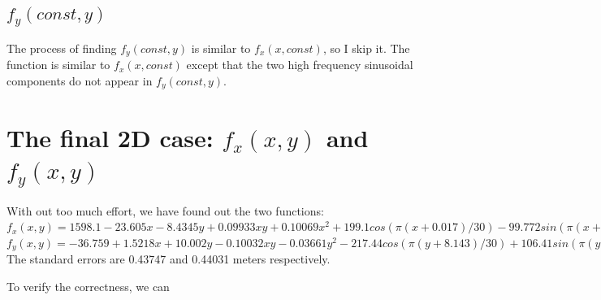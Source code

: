 \documentclass[a4paper]{article}
\begin{document}
\subsection{$f_y(const, y)$}

The process of finding $f_y(const, y)$ is similar to $f_x(x, const)$, so I skip
it. The function is similar to $f_x(x, const)$ except that the two high
frequency sinusoidal components do not appear in $f_y(const, y)$.

\section{The final 2D case: $f_x(x,y)$ and $f_y(x,y)$}
With out too much effort, we have found out the two functions:
$f_x(x,y) = 1598.1-23.605x -8.4345y +0.09933xy +0.10069x^2
+199.1cos(\pi(x+0.017)/30) -99.772sin(\pi(x+0.0039)/12+\pi/4)
-26.687sin(\pi(x-0.0039)/3) -13.345sin(\pi(x-0.0039))
+13.338sin(2\pi(x-0.0039)) +13.331sin(6\pi(x-0.0039))$ $f_y(x,y) = -36.759
+1.5218x +10.002y -0.10032xy -0.03661y^2 -217.44cos(\pi(y+8.143)/30)
+106.41sin(\pi(y+1.1)/12) -26.697sin(\pi(y+1)/3) +13.335sin(\pi y)
-13.329sin(2\pi(x-0.0039)) -13.319sin(6\pi(x-0.0039))$
The standard errors are 0.43747 and 0.44031 meters respectively.

To verify the correctness, we can 
\end{document}
